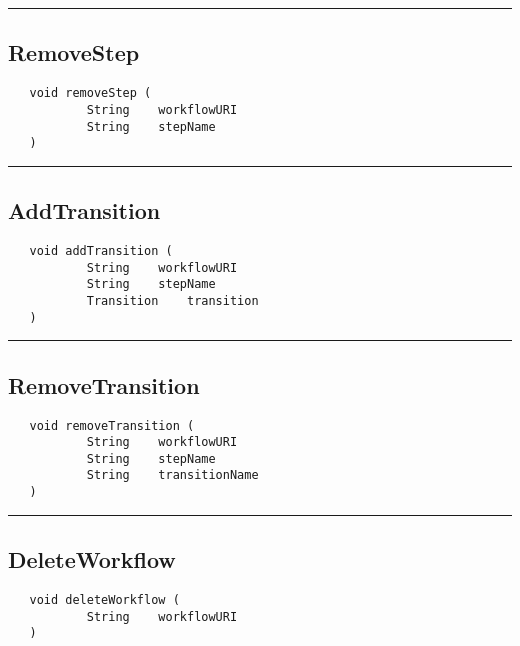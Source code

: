 \rule{15cm}{2pt}
\subsection{RemoveStep}
\label{Api:RemoveStep}
\begin{verbatim}
   void removeStep (
           String    workflowURI
           String    stepName
   )
\end{verbatim}



\rule{15cm}{2pt}
\subsection{AddTransition}
\label{Api:AddTransition}
\begin{verbatim}
   void addTransition (
           String    workflowURI
           String    stepName
           Transition    transition
   )
\end{verbatim}



\rule{15cm}{2pt}
\subsection{RemoveTransition}
\label{Api:RemoveTransition}
\begin{verbatim}
   void removeTransition (
           String    workflowURI
           String    stepName
           String    transitionName
   )
\end{verbatim}



\rule{15cm}{2pt}
\subsection{DeleteWorkflow}
\label{Api:DeleteWorkflow}
\begin{verbatim}
   void deleteWorkflow (
           String    workflowURI
   )
\end{verbatim}



